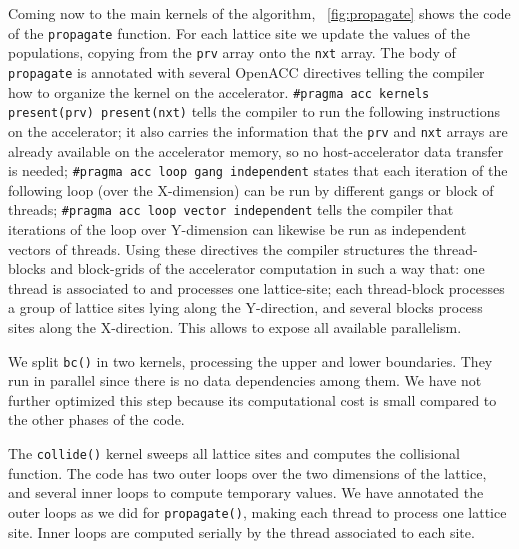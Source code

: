 \documentclass[times]{cpeauth}
\begin{document}
Coming now to the main kernels of the algorithm, \figurename~\ref{fig:propagate} 
shows the code of the {\tt propagate} function. 
%
For each lattice site we update the values of the populations, 
copying from the {\tt prv} array onto the {\tt nxt} array. 
%
The body of {\tt propagate} is annotated with several OpenACC 
directives telling the compiler how to organize the kernel
on the accelerator. 
%
{\tt \#pragma acc kernels present(prv) present(nxt)} tells the compiler to run the
following instructions on the accelerator; it also carries the information
that the {\tt prv} and {\tt nxt} arrays are already available on the accelerator
memory, so no host-accelerator data transfer is needed;
%
{\tt \#pragma acc loop gang independent} states that each iteration 
of the following loop (over the X-dimension) can be run by different gangs or
block of threads;
%
{\tt \#pragma acc loop vector independent} tells the compiler that  
iterations of the loop over Y-dimension can likewise be run as 
independent vectors of threads. 
%
Using these directives the compiler structures the thread-blocks and 
block-grids of the accelerator computation in such a way that: one thread is associated 
to and processes one lattice-site; each thread-block processes a group 
of lattice sites lying along the Y-direction, and several blocks 
process sites along the X-direction. This allows to expose all available 
parallelism. 

We split {\tt bc()} in two kernels,  
processing the upper and lower boundaries. They run in parallel 
since there is no data dependencies among them.
We have not further optimized this step because its computational cost 
is small compared to the other phases of the code.

The {\tt collide()} kernel sweeps all lattice sites and computes 
the collisional function. The code has two outer loops over the two  
dimensions of the lattice, and several inner loops to compute temporary 
values. We have annotated the outer loops as we did for {\tt propagate()}, 
making each thread to process one lattice site. Inner 
loops are computed serially by the thread associated to each site.

\end{document}
